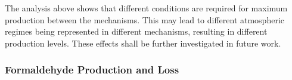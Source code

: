 The analysis above shows that different  conditions are required for maximum  production between the mechanisms.
This may lead to different atmospheric regimes being represented in different mechanisms, resulting in different  production levels.
These effects shall be further investigated in future work.

\subsubsection{Formaldehyde Production and Loss} \label{sss:HCHO}


